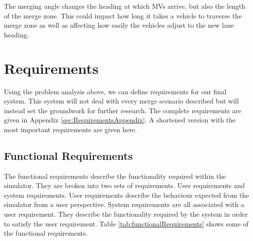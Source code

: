 The merging angle changes the heading at which MVs arrive, but also the length of the merge zone. This could impact how long it takes a vehicle to traverse the merge zone as well as affecting how easily the vehicles adjust to the new lane heading.

\section{Requirements}
\label{sec:Requirements}
Using the problem analysis above, we can define requirements for our final system. This system will not deal with every merge scenario described but will instead set the groundwork for further research. The complete requirements are given in Appendix \ref{sec:RequirementsAppendix}. A shortened version with the most important requirements are given here.

\subsection{Functional Requirements}
\label{subsec:Functional Requirements}
The functional requirements describe the functionality required within the simulator. They are broken into two sets of requirements. User requirements and system requirements. User requirements describe the behaviour expected from the simulator from a user perspective. System requirements are all associated with a user requirement. They describe the functionality required by the system in order to satisfy the user requirement. Table \ref{tab:functionalRequirements} shows some of the functional requirements.

